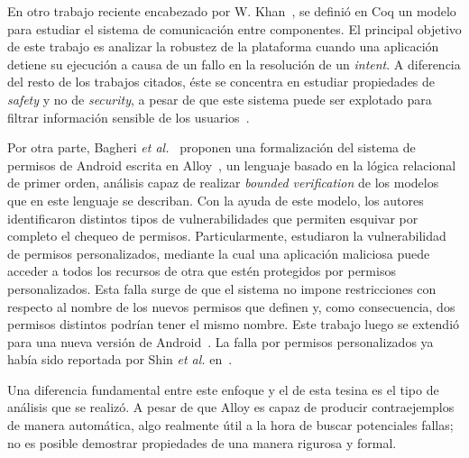 En otro trabajo reciente encabezado por W. Khan~\cite{crashsafe}, se definió en
Coq un modelo para estudiar el sistema de comunicación entre componentes. El
principal objetivo de este trabajo es analizar la robustez de la plataforma
cuando una aplicación detiene su ejecución a causa de un fallo en la resolución
de un \textit{intent}. A diferencia del resto de los trabajos citados, éste se
concentra en estudiar propiedades de \textit{safety} y no de \textit{security}, a
pesar de que este sistema puede ser explotado para filtrar información sensible de
los usuarios~\cite{iccta}.

Por otra parte, Bagheri \textit{et al.}~\cite{bagheri15} proponen una
formalización del sistema de permisos de Android escrita en Alloy~\cite{alloy},
un lenguaje basado en la lógica relacional de primer orden,
%
%
análisis capaz de realizar \textit{bounded verification} de los modelos que en
este lenguaje se describan. Con la ayuda de este modelo, los autores
identificaron distintos tipos de vulnerabilidades que permiten esquivar por
completo el chequeo de permisos. Particularmente, estudiaron la vulnerabilidad
de permisos personalizados, mediante la cual una aplicación maliciosa puede
acceder a todos los recursos de otra que estén protegidos por permisos
personalizados. Esta falla surge de que el sistema no impone restricciones con
respecto al nombre de los nuevos permisos que definen y, como consecuencia, dos
permisos distintos podrían tener el mismo nombre. Este trabajo luego se extendió
para una nueva versión de Android~\cite{bagheri}. La falla por permisos
personalizados ya había sido reportada por Shin \textit{et al.}
en~\cite{shin-custom}.

Una diferencia fundamental entre este enfoque y el de esta tesina es el tipo de
análisis que se realizó. A pesar de que Alloy es capaz de producir
contraejemplos de manera automática, algo realmente útil a la hora de buscar
potenciales fallas; no es posible demostrar propiedades de una manera rigurosa y
formal.



